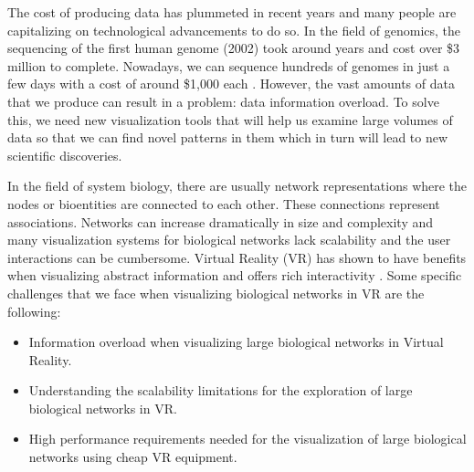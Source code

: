 
The cost of producing data has plummeted in recent years and many people are capitalizing on technological advancements to do so. In the field of genomics, the sequencing of the first human genome (2002) took around years and cost over \$3 million to complete. Nowadays, we can sequence hundreds of genomes in just a few days with a cost of around \$1,000 each \cite{big_biological_impacts_bd}. However, the vast amounts of data that we produce can result in a problem: data information overload. To solve this, we need new visualization tools that will help us examine large volumes of data so that we can find novel patterns in them which in turn will lead to new scientific discoveries.



In the field of system biology, there are usually network representations where the nodes or bioentities are connected to each other. These connections represent associations. Networks can increase dramatically in size and complexity and many visualization systems for biological networks lack scalability and the user interactions can be cumbersome. Virtual Reality (VR) has shown to have benefits when visualizing abstract information and offers rich interactivity \cite{zhang_paciorkowski_craig_cui_2019}. Some specific challenges that we face when visualizing biological networks in VR are the following:
\begin{itemize}
  \item Information overload when visualizing large biological networks in Virtual Reality.
  \item Understanding the scalability limitations for the exploration of large biological networks in VR.
  \item High performance requirements needed for the visualization of large biological networks using cheap VR equipment.
\end{itemize}


